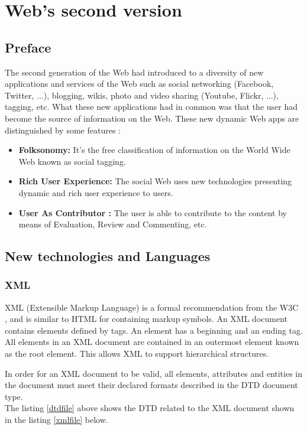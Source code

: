 \section{Web's second version}
\label{sec_web2_0}

\subsection{Preface}
\label{subsec_pres_web_2_0}

The second generation of the Web \cite{web2030} had introduced  to a diversity of new applications and services of the Web such as social networking (Facebook, Twitter, ...), blogging, wikis, photo and video sharing (Youtube, Flickr, ...), tagging, etc. What these new applications had in common was that the user had become the source of information on the Web. These new dynamic Web apps are distinguished by some features : 

 \begin{itemize}
 \item \textbf{Folksonomy:} It's the free classification of information on the World Wide Web known as social tagging.
 \item \textbf{Rich User Experience:} The social Web uses new technologies presenting dynamic and rich user experience to users. %
 \item \textbf{User As Contributor :} The user is able to contribute to the content by means of Evaluation, Review and Commenting, etc.
 \end{itemize}
		
\subsection{New technologies and Languages}
\label{subsec_app_tech}
\subsubsection{XML}
XML (Extensible Markup Language) is a formal recommendation from the W3C \cite{xml}, and is similar to HTML for containing markup symbols. An XML document contains elements defined by tags. An element has a beginning and an ending tag. All elements in an XML document are contained in an outermost element known as the root element. This allows XML to support hierarchical structures.  

In order for an XML document to be valid, all elements, attributes and entities in the document must meet their declared formats described in the DTD document type.\\
The listing \ref{dtdfile} above shows the DTD related to the XML document shown in the listing \ref{xmlfile} below.

